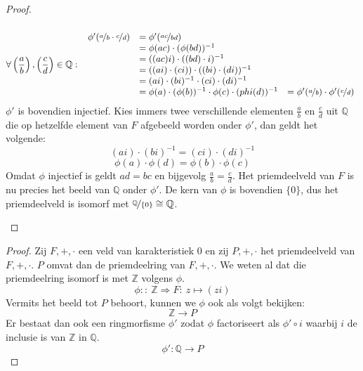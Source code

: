 \documentclass[main.tex]{subfiles}
\begin{document}
\begin{st}
\begin{proof}
\begin{itemize}
\[      \]
      \[
      \forall \left(\frac{a}{b}\right),\left(\frac{c}{d}\right) \in
      \mathbb{Q}:\
      \begin{array}{rll}
        \phi'(\nicefrac{a}{b} \cdot \nicefrac{c}{d}) &= \phi'(\nicefrac{ac}{bd}) &\\
                                                     &= \phi(ac) \cdot (\phi(bd))^{-1} &\\
                                                     &= ((ac)i) \cdot ((bd) \cdot i)^{-1} &\\
                                                     &= ((ai) \cdot (ci)) \cdot ((bi) \cdot (di))^{-1} &\\
                                                     &= (ai) \cdot (bi)^{-1} \cdot (ci) \cdot (di)^{-1} &\\
                                                     &= \phi(a) \cdot (\phi(b))^{-1} \cdot \phi(c) \cdot (phi(d))^{-1} &= \phi'(\nicefrac{a}{b}) \cdot \phi'(\nicefrac{c}{d})
      \end{array}
      \]
      $\phi'$ is bovendien injectief.  Kies immers twee verschillende
      elementen $\frac{a}{b}$ en $\frac{c}{d}$ uit $\mathbb{Q}$ die op
      hetzelfde element van $F$ afgebeeld worden onder $\phi'$, dan
      geldt het volgende:
      \[ (ai) \cdot (bi)^{-1} = (ci) \cdot (di)^{-1} \]
      \[ \phi(a) \cdot \phi(d) = \phi(b) \cdot \phi(c) \]
      Omdat $\phi$ injectief is geldt $ad = bc$ en bijgevolg
      $\frac{a}{b} = \frac{c}{d}$.
      Het priemdeelveld van $F$ is nu precies het beeld van $\mathbb{Q}$ onder $\phi'$. \waarom
      De kern van $\phi$ is bovendien $\{0\}$, dus het priemdeelveld is isomorf met $\nicefrac{\mathbb{Q}}{\{0\}} \cong \mathbb{Q}$.
    \end{itemize}
  \end{proof}
  \begin{proof}
    Zij $F,+,\cdot$ een veld van karakteristiek $0$ en zij $P,+,\cdot$ het priemdeelveld van $F,+,\cdot$.
    $P$ omvat dan de priemdeelring van $F,+,\cdot$.
    We weten al dat die priemdeelring isomorf is met $\mathbb{Z}$ volgens $\phi$.
    \[ \phi::\ \mathbb{Z} \Rightarrow F:\ z \mapsto (zi)\]
    Vermits het beeld tot $P$ behoort, kunnen we $\phi$ ook als volgt bekijken:
    \[ \mathbb{Z} \rightarrow P \]
    Er bestaat dan ook een ringmorfisme $\phi'$ zodat $\phi$ factoriseert als $\phi' \circ i$ waarbij $i$ de inclusie is van $\mathbb{Z}$ in $\mathbb{Q}$. 
    \[ \phi': \mathbb{Q} \rightarrow P \]

\end{proof}
\end{st}
\end{document}
